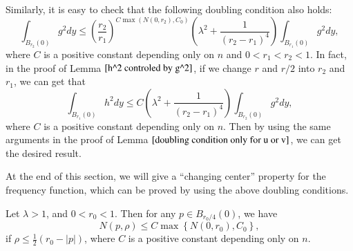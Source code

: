 \documentclass[a4paper, 12pt, onecolumn]{article} \textwidth 148mm
\begin{document}
\begin{remark}\label{remark for doubling condition only for u with any radius}
Similarly, it is easy to check that the following doubling condition also holds:
\begin{equation}\label{doubling condition only for u with any radius}
\int_{B_{r_2}(0)}g^2dy\leq \left(\frac{r_2}{r_1}\right)^{C\max(N(0,r_2),C_0)}
\left(\lambda^2+\frac{1}{(r_2-r_1)^4}\right)\int_{B_{r_1}(0)}g^2dy,
\end{equation}
where $C$ is a positive constant depending only on $n$ and $0<r_1<r_2<1$.
In fact, in the proof of Lemma $\ref{h^2 controled by g^2}$,
if we change $r$ and $r/2$ into $r_2$ and $r_1$, we can get that
\begin{equation*}
\int_{B_{r_1}(0)}h^2dy\leq C\left(\lambda^2+\frac{1}{(r_2-r_1)^4}\right)\int_{B_{r_2}(0)}g^2dy,
\end{equation*}
where $C$ is a positive constant depending only on $n$. Then by using the same arguments in the proof of Lemma $\ref{doubling condition only for u or v}$, we can get the desired result.
\end{remark}

At the end of this section, we will give a ``changing center'' property for the frequency function, which can be proved by using the above doubling conditions.

\begin{theorem}\label{frequency change center}
Let $\lambda>1$, and $0<r_0<1$.
Then for any $p\in B_{r_0/4}(0)$, we have
\begin{equation}\label{changing center property}
N(p,\rho)\leq C\max\left\{N(0,r_0),C_0\right\},
\end{equation}
if $\rho\leq\frac{1}{2}(r_0-|p|)$, where $C$ is a positive constant depending only on $n$.
\end{theorem}
\end{document}
